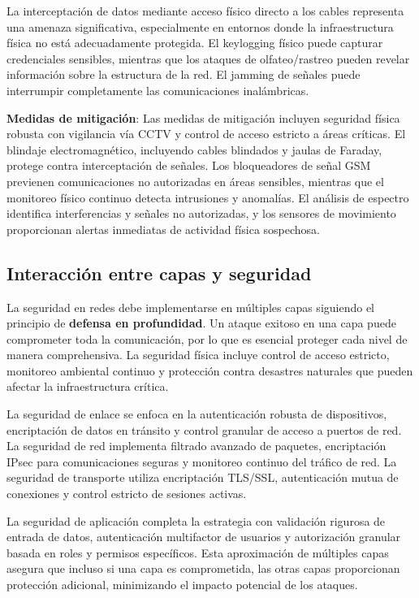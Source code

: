 \begin{itemize}
La interceptación de datos mediante acceso físico directo a los cables representa una amenaza significativa, especialmente en entornos donde la infraestructura física no está adecuadamente protegida. El keylogging físico puede capturar credenciales sensibles, mientras que los ataques de olfateo/rastreo pueden revelar información sobre la estructura de la red. El jamming de señales puede interrumpir completamente las comunicaciones inalámbricas.

\textbf{Medidas de mitigación}:
Las medidas de mitigación incluyen seguridad física robusta con vigilancia vía CCTV y control de acceso estricto a áreas críticas. El blindaje electromagnético, incluyendo cables blindados y jaulas de Faraday, protege contra interceptación de señales. Los bloqueadores de señal GSM previenen comunicaciones no autorizadas en áreas sensibles, mientras que el monitoreo físico continuo detecta intrusiones y anomalías. El análisis de espectro identifica interferencias y señales no autorizadas, y los sensores de movimiento proporcionan alertas inmediatas de actividad física sospechosa.

\subsection{Interacción entre capas y seguridad}

La seguridad en redes debe implementarse en múltiples capas siguiendo el principio de \textbf{defensa en profundidad}. Un ataque exitoso en una capa puede comprometer toda la comunicación, por lo que es esencial proteger cada nivel de manera comprehensiva. La seguridad física incluye control de acceso estricto, monitoreo ambiental continuo y protección contra desastres naturales que pueden afectar la infraestructura crítica.

La seguridad de enlace se enfoca en la autenticación robusta de dispositivos, encriptación de datos en tránsito y control granular de acceso a puertos de red. La seguridad de red implementa filtrado avanzado de paquetes, encriptación IPsec para comunicaciones seguras y monitoreo continuo del tráfico de red. La seguridad de transporte utiliza encriptación TLS/SSL, autenticación mutua de conexiones y control estricto de sesiones activas.

La seguridad de aplicación completa la estrategia con validación rigurosa de entrada de datos, autenticación multifactor de usuarios y autorización granular basada en roles y permisos específicos. Esta aproximación de múltiples capas asegura que incluso si una capa es comprometida, las otras capas proporcionan protección adicional, minimizando el impacto potencial de los ataques.


\end{itemize}
